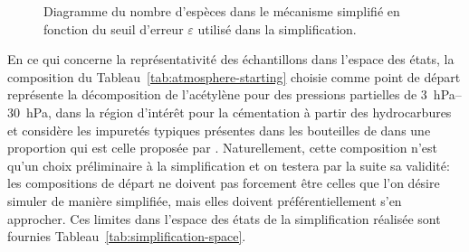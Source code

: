 \begin{figure}[h]
  \centering{}
    
  \caption{\label{fig:diagramme_reduction}Diagramme du nombre d'espèces dans le mécanisme simplifié en fonction du seuil d'erreur $\varepsilon$ utilisé dans la simplification.}
\end{figure}

En ce qui concerne la représentativité des échantillons dans l'espace des états, la composition du Tableau~\ref{tab:atmosphere-starting} choisie comme point de départ représente la décomposition de l'acétylène pour des pressions partielles de \SIrange{3}{30}{\hecto\pascal}, dans la région d'intérêt pour la cémentation à partir des hydrocarbures et considère les impuretés typiques présentes dans les bouteilles de  dans une proportion qui est celle proposée par \citet{Norinaga2007}. Naturellement, cette composition n'est qu'un choix préliminaire à la simplification et on testera par la suite sa validité: les compositions de départ ne doivent pas forcement être celles que l'on désire simuler de manière simplifiée, mais elles doivent préférentiellement s'en approcher. Ces limites dans l'espace des états de la simplification réalisée sont fournies Tableau~\ref{tab:simplification-space}.

